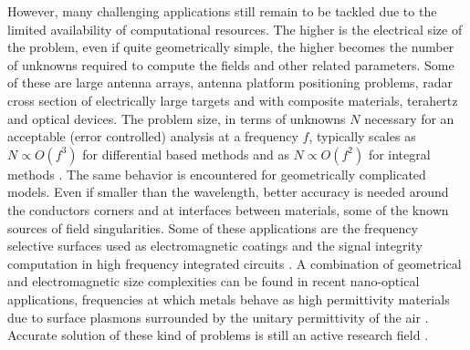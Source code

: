 However, many challenging applications still remain to be tackled due to the limited availability of computational resources. The higher is the electrical size of the problem, even if quite geometrically simple, the higher becomes the number of unknowns required to compute the fields and other related parameters. Some of these are large antenna arrays, antenna platform positioning problems, radar cross section of electrically large targets and with composite materials, terahertz and optical devices. The problem size, in terms of unknowns $N$ necessary for an acceptable (error controlled) analysis at a frequency $f$, typically scales as $N \propto O(f^3)$ for differential based methods and as $N \propto O(f^2)$ for integral methods \cite{lee2011maturity}. The same behavior is encountered for geometrically complicated models. Even if smaller than the wavelength, better accuracy is needed around the conductors corners and at interfaces between materials, some of the known sources of field singularities. Some of these applications are the frequency selective surfaces used as electromagnetic coatings and the signal integrity computation in high frequency integrated circuits \cite{lee2011maturity, mittra2004look}. A combination of geometrical and electromagnetic size complexities can be found in recent nano-optical applications, frequencies at which metals behave as high permittivity materials due to surface plasmons surrounded by the unitary permittivity of the air \cite{tsukerman2008computational}. Accurate solution of these kind of problems is still an active research field \cite{tsukerman1998comparison}.

